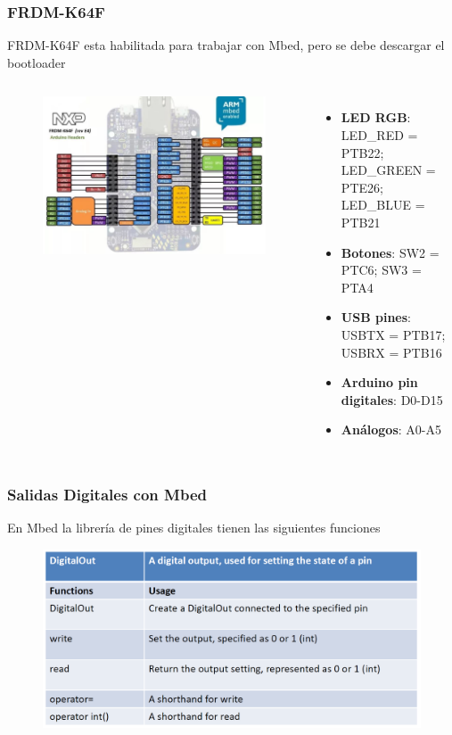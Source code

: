 \documentclass[10.5pt,scale=1.0,t,aspectratio=169,hyperref={pdfpagelabels=false}]{beamer}
\begin{document}
\begin{frame}
	\frametitle{FRDM-K64F}
	FRDM-K64F esta habilitada para trabajar con Mbed, pero se debe descargar el bootloader
	
	\begin{columns}
		\begin{figure}
			\centering
			\includegraphics[scale=0.2]{02_K64F}
		\end{figure}
	
		\begin{itemize}
			\item \textbf{LED RGB}: LED\_RED = PTB22; LED\_GREEN = PTE26; LED\_BLUE = PTB21
			\item \textbf{Botones}: SW2 = PTC6; SW3 = PTA4  
			\item \textbf{USB pines}: USBTX = PTB17; USBRX = PTB16 
			\item \textbf{Arduino pin digitales}:  D0-D15
			\item \textbf{Análogos}: A0-A5
		\end{itemize}
	\end{columns}
	
\end{frame}
\begin{frame}
	\frametitle{Salidas Digitales con Mbed}
	En Mbed la librería de pines digitales tienen las siguientes funciones
	\begin{figure}
		\centering
		\includegraphics[scale=0.5]{03_DigitalFunctions}
	\end{figure}
\end{frame}
\end{document}

